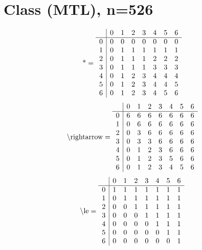 \documentclass[11pt]{article}
\begin{document}
\section{Class (MTL), n=526}
\[\text{*} = 
\begin{array}{r | r r r r r r r}
 & 0 & 1 & 2 & 3 & 4 & 5 & 6 \\ \hline
0 & 0 & 0 & 0 & 0 & 0 & 0 & 0 \\
1 & 0 & 1 & 1 & 1 & 1 & 1 & 1 \\
2 & 0 & 1 & 1 & 1 & 2 & 2 & 2 \\
3 & 0 & 1 & 1 & 1 & 3 & 3 & 3 \\
4 & 0 & 1 & 2 & 3 & 4 & 4 & 4 \\
5 & 0 & 1 & 2 & 3 & 4 & 4 & 5 \\
6 & 0 & 1 & 2 & 3 & 4 & 5 & 6 \\
\end{array}
\]
\[\text{\textbackslash rightarrow} = 
\begin{array}{r | r r r r r r r}
 & 0 & 1 & 2 & 3 & 4 & 5 & 6 \\ \hline
0 & 6 & 6 & 6 & 6 & 6 & 6 & 6 \\
1 & 0 & 6 & 6 & 6 & 6 & 6 & 6 \\
2 & 0 & 3 & 6 & 6 & 6 & 6 & 6 \\
3 & 0 & 3 & 3 & 6 & 6 & 6 & 6 \\
4 & 0 & 1 & 2 & 3 & 6 & 6 & 6 \\
5 & 0 & 1 & 2 & 3 & 5 & 6 & 6 \\
6 & 0 & 1 & 2 & 3 & 4 & 5 & 6 \\
\end{array}
\]
\[\text{\textbackslash le} = 
\begin{array}{r | r r r r r r r}
 & 0 & 1 & 2 & 3 & 4 & 5 & 6 \\ \hline
0 & 1 & 1 & 1 & 1 & 1 & 1 & 1 \\
1 & 0 & 1 & 1 & 1 & 1 & 1 & 1 \\
2 & 0 & 0 & 1 & 1 & 1 & 1 & 1 \\
3 & 0 & 0 & 0 & 1 & 1 & 1 & 1 \\
4 & 0 & 0 & 0 & 0 & 1 & 1 & 1 \\
5 & 0 & 0 & 0 & 0 & 0 & 1 & 1 \\
6 & 0 & 0 & 0 & 0 & 0 & 0 & 1 \\
\end{array}
\]
\end{document}
